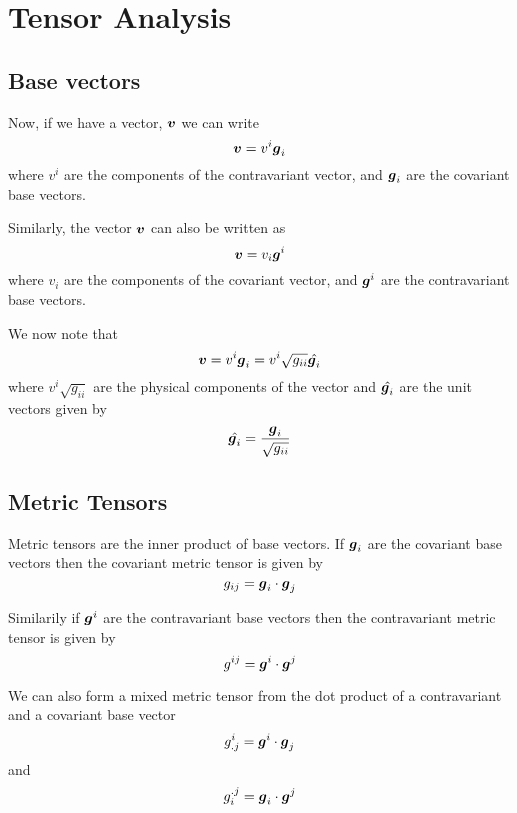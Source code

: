 \section{Tensor Analysis}
\subsection{Base vectors}

Now, if we have a vector, $\vect{v}$ we can write
\begin{equation}
  \vect{v}=v^{i}\vect{g}_{i}
\end{equation}
where $v^{i}$ are the components of the contravariant vector, and
$\vect{g}_{i}$ are the covariant base vectors.

Similarly, the vector $\vect{v}$ can also be written as 
\begin{equation}
  \vect{v}=v_{i}\vect{g}^{i}
\end{equation}
where $v_{i}$ are the components of the covariant vector, and
$\vect{g}^{i}$ are the contravariant base vectors. 

We now note that
\begin{equation}
  \vect{v}=v^{i}\vect{g}_{i}=v^{i}\sqrt{g_{ii}}\hat{\vect{g}_{i}}
\end{equation}
where $v^{i}\sqrt{g_{ii}}$ are the physical components of the vector and
$\hat{\vect{g}_{i}}$ are the unit vectors given by
\begin{equation}
  \hat{\vect{g}_{i}}=\dfrac{\vect{g}_{i}}{\sqrt{g_{ii}}}
\end{equation}

\subsection{Metric Tensors}
\label{sec:metric tensors}

Metric tensors are the inner product of base vectors. If $\vect{g}_{i}$ are the
covariant base vectors then the covariant metric tensor is given by
\begin{equation}
  g_{ij}=\dotprod{\vect{g}_{i}}{\vect{g}_{j}}
\end{equation}

Similarily if $\vect{g}^{i}$ are the contravariant base vectors then the
contravariant metric tensor is given by 
\begin{equation}
  g^{ij}=\dotprod{\vect{g}^{i}}{\vect{g}^{j}}
\end{equation}

We can also form a mixed metric tensor from the dot product of a contravariant
and a covariant base vector \ie
\begin{equation}
  g^{i}_{.j}=\dotprod{\vect{g}^{i}}{\vect{g}_{j}}
\end{equation}
and 
\begin{equation}
  g_{i}^{.j}=\dotprod{\vect{g}_{i}}{\vect{g}^{j}}
\end{equation}

